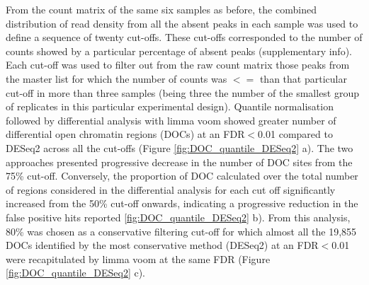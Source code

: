 From the count matrix of the same six samples as before, the combined distribution of read density from all the absent peaks in each sample was used to define a sequence of twenty cut-offs. These cut-offs corresponded to the number of counts showed by a particular percentage of absent peaks (supplementary info). Each cut-off was used to filter out from the raw count matrix those peaks from the master list for which the number of counts was $<=$ than that particular cut-off in more than three samples  (being three the number of the smallest group of replicates in this particular experimental design). Quantile normalisation followed by differential analysis with limma voom showed greater number of differential open chromatin regions (DOCs) at an FDR$<$0.01 compared to DESeq2 across all the cut-offs (Figure \ref{fig:DOC_quantile_DESeq2} a). The two approaches presented progressive decrease in the number of DOC sites from the 75\% cut-off. Conversely, the proportion of DOC calculated over the total number of regions considered in the differential analysis for each cut off significantly increased from the 50\% cut-off onwards, indicating a progressive reduction in the false positive hits reported \ref{fig:DOC_quantile_DESeq2} b). 
From this analysis, 80\% was chosen as a conservative filtering cut-off for which almost all the 19,855 DOCs identified by the most conservative method (DESeq2) at an FDR$<$0.01 were recapitulated by limma voom at the same FDR (Figure \ref{fig:DOC_quantile_DESeq2} c). 

